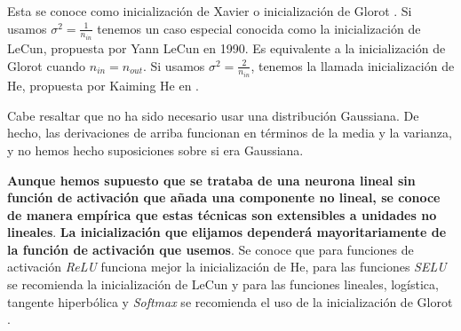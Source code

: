 Esta se conoce como inicialización de Xavier o inicialización de Glorot \cite{stabilityProblem2}. Si usamos $\sigma^2= \frac{1}{n_{in}}$ tenemos un caso especial conocida como la inicialización de LeCun, propuesta por Yann LeCun en 1990. Es equivalente a la inicialización de Glorot cuando $n_{in}=n_{out}$. Si usamos $\sigma^2 = \frac{2}{n_{in}}$, tenemos la llamada inicialización de He, propuesta por Kaiming He en \cite{heinic}.


Cabe resaltar que no ha sido necesario usar una distribución Gaussiana. De hecho, las derivaciones de arriba funcionan en términos de la media y la varianza, y no hemos hecho suposiciones sobre si era Gaussiana. 


\textbf{Aunque hemos supuesto que se trataba de una neurona lineal sin función de activación que añada una componente no lineal, se conoce de manera empírica que estas técnicas son extensibles a unidades no lineales}. \textbf{La inicialización que elijamos dependerá mayoritariamente de la función de activación que usemos}. Se conoce que para funciones de activación \textit{ReLU} funciona mejor la inicialización de He, para las funciones \textit{SELU} se recomienda la inicialización de LeCun y para las funciones lineales, logística, tangente hiperbólica y \textit{Softmax} se recomienda el uso de la inicialización de Glorot \cite{pml1Book}.